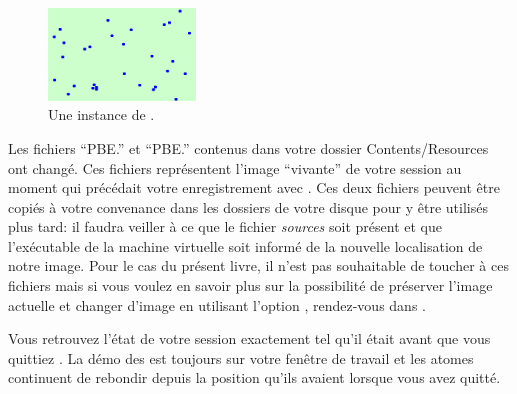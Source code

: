 \documentclass[a4paper,10pt,twoside]{book}
\begin{document}

\begin{figure}[htb]
 	{\centerline{\includegraphics[width=0.35\textwidth]{atoms}}}
 	\caption{Une instance de \bam.}
\end{figure}


Les fichiers ``PBE.'' et ``PBE.'' 
contenus dans votre dossier \textsf{Contents/Resources} ont changé.
Ces fichiers représentent l'image ``vivante'' de votre session \pharo au moment
qui précédait votre enregistrement avec .
Ces deux fichiers peuvent être copiés à votre convenance dans les
dossiers de votre disque pour y être utilisés plus tard: il faudra veiller
à ce que le fichier \emph{sources} soit présent et que l'exécutable de la machine
virtuelle soit informé de la nouvelle localisation de notre image. Pour le cas du
présent livre, il n'est pas souhaitable de toucher à ces fichiers mais si vous voulez
en savoir plus sur la possibilité de préserver l'image actuelle et changer d'image en utilisant
l'option , rendez-vous dans .


Vous retrouvez l'état de votre session exactement tel qu'il était
avant que vous quittiez \pharo. La démo des \bamfr{} est toujours sur votre
fenêtre de travail et les atomes continuent de rebondir depuis la position
qu'ils avaient lorsque vous avez quitté. 
\end{document}
